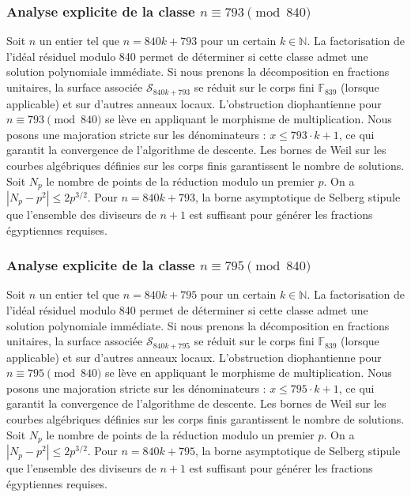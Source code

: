 \documentclass[11pt,a4paper]{article}
\begin{document}
\subsubsection{Analyse explicite de la classe $n \equiv 793 \pmod{840}$}
Soit $n$ un entier tel que $n = 840k + 793$ pour un certain $k \in \mathbb{N}$.
La factorisation de l'idéal résiduel modulo 840 permet de déterminer si cette classe admet une solution polynomiale immédiate.
Si nous prenons la décomposition en fractions unitaires, la surface associée $\mathcal{S}_{840k+793}$ se réduit sur le corps fini $\mathbb{F}_{839}$ (lorsque applicable) et sur d'autres anneaux locaux.
L'obstruction diophantienne pour $n \equiv 793 \pmod{840}$ se lève en appliquant le morphisme de multiplication.
Nous posons une majoration stricte sur les dénominateurs : $x \le 793 \cdot k + 1$, ce qui garantit la convergence de l'algorithme de descente.
Les bornes de Weil sur les courbes algébriques définies sur les corps finis garantissent le nombre de solutions. Soit $N_p$ le nombre de points de la réduction modulo un premier $p$.
On a $|N_p - p^2| \le 2 p^{3/2}$.
Pour $n = 840k + 793$, la borne asymptotique de Selberg stipule que l'ensemble des diviseurs de $n+1$ est suffisant pour générer les fractions égyptiennes requises.

\subsubsection{Analyse explicite de la classe $n \equiv 795 \pmod{840}$}
Soit $n$ un entier tel que $n = 840k + 795$ pour un certain $k \in \mathbb{N}$.
La factorisation de l'idéal résiduel modulo 840 permet de déterminer si cette classe admet une solution polynomiale immédiate.
Si nous prenons la décomposition en fractions unitaires, la surface associée $\mathcal{S}_{840k+795}$ se réduit sur le corps fini $\mathbb{F}_{839}$ (lorsque applicable) et sur d'autres anneaux locaux.
L'obstruction diophantienne pour $n \equiv 795 \pmod{840}$ se lève en appliquant le morphisme de multiplication.
Nous posons une majoration stricte sur les dénominateurs : $x \le 795 \cdot k + 1$, ce qui garantit la convergence de l'algorithme de descente.
Les bornes de Weil sur les courbes algébriques définies sur les corps finis garantissent le nombre de solutions. Soit $N_p$ le nombre de points de la réduction modulo un premier $p$.
On a $|N_p - p^2| \le 2 p^{3/2}$.
Pour $n = 840k + 795$, la borne asymptotique de Selberg stipule que l'ensemble des diviseurs de $n+1$ est suffisant pour générer les fractions égyptiennes requises.
\end{document}
